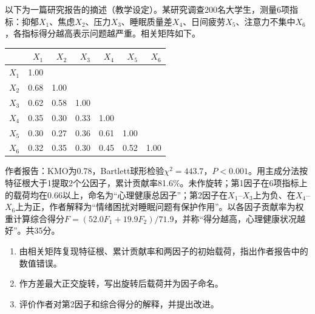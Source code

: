 \par\addvspace{6pt}\noindent\begin{minipage}{\linewidth}


以下为一篇研究报告的摘述（教学设定）。某研究调查200名大学生，测量6项指标：抑郁\(X_1\)、焦虑\(X_2\)、压力\(X_3\)、睡眠质量差\(X_4\)、日间疲劳\(X_5\)、注意力不集中\(X_6\)，各指标得分越高表示问题越严重。相关矩阵如下。

\begin{center}\small\setlength{\tabcolsep}{5pt}\renewcommand{\arraystretch}{1.18}\begin{tabular}{@{}lrrrrrr@{}}
\toprule
 & \(X_1\) & \(X_2\) & \(X_3\) & \(X_4\) & \(X_5\) & \(X_6\) \\
\midrule
\(X_1\) & 1.00 & & & & & \\
\(X_2\) & 0.68 & 1.00 & & & & \\
\(X_3\) & 0.62 & 0.58 & 1.00 & & & \\
\(X_4\) & 0.35 & 0.30 & 0.33 & 1.00 & & \\
\(X_5\) & 0.30 & 0.27 & 0.36 & 0.61 & 1.00 & \\
\(X_6\) & 0.32 & 0.35 & 0.30 & 0.45 & 0.52 & 1.00 \\
\bottomrule\end{tabular}\end{center}

作者报告：KMO为0.78，Bartlett球形检验\(\chi^2=443.7\)，\(P<0.001\)。用主成分法按特征根大于1提取2个公因子，累计贡献率81.6\%。未作旋转；第1因子在6项指标上的载荷均在0.66以上，命名为``心理健康总因子''；第2因子在\(X_1\)--\(X_3\)上为负、在\(X_4\)--\(X_6\)上为正，作者解释为``情绪困扰对睡眠问题有保护作用''。以各因子贡献率为权重计算综合得分\(F=(52.0F_1+19.9F_2)/71.9\)，并称``得分越高，心理健康状况越好''。共35分。

\begin{enumerate}
\def\labelenumi{\arabic{enumi}.}
\tightlist
\item
  由相关矩阵复现特征根、累计贡献率和两因子的初始载荷，指出作者报告中的数值错误。
\item
  作方差最大正交旋转，写出旋转后载荷并为因子命名。
\item
  评价作者对第2因子和综合得分的解释，并提出改进。
\end{enumerate}


\end{minipage}\par\vspace{4pt}

